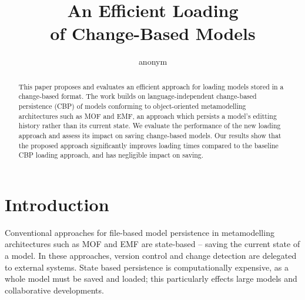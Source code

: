 \documentclass{llncs}
\begin{document}
    \renewcommand{\thelstlisting}{\arabic{lstlisting}}
    \renewcommand{\labelitemi}{$\bullet$}
    \newcommand{\dk}[1]{\textbf{[DK: #1]}}
    
    \title{An Efficient Loading \\ of Change-Based Models}
    \author{
anonym%
    }
    
    
    \maketitle      %
    \begin{abstract}
This paper proposes and evaluates an efficient approach for loading models stored in a change-based format. The work builds on language-independent change-based persistence (CBP) of models conforming to object-oriented metamodelling architectures such as MOF and EMF, an approach which persists a model's editting history rather than its current state. We evaluate the performance of the new loading approach  and assess its impact on saving change-based models. Our results show that the proposed approach significantly improves loading times compared to the baseline CBP loading approach, and has negligible impact on saving.


    \end{abstract}
    
    \section{Introduction}
    \label{sec:introduction}
    Conventional approaches for file-based model persistence in metamodelling architectures such as MOF \cite{omg2018mof} and EMF \cite{steinberg2008emf} are state-based -- saving the current state of a model.  In these approaches,  version control and change detection are delegated to external systems.  State based persistence is computationally expensive, as a whole model must be saved and loaded; this particularly effects large models and collaborative developments.
    
\end{document}
